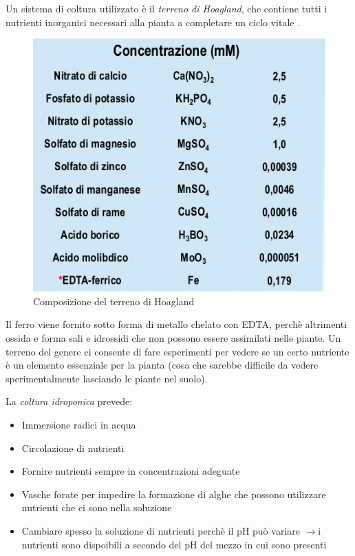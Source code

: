 \documentclass[a4paper,12pt]{book}
\newcommand{\lfreccia}{\ensuremath{\longrightarrow}}
\begin{document}
Un sistema di coltura utilizzato è il \emph{terreno di Hoagland}, che contiene tutti i nutrienti inorganici necessari alla pianta a completare un ciclo vitale .
\begin{figure}[H]
\centering
\includegraphics[scale=0.4]{immagini/hoagland.jpg}
\caption{Composizione del terreno di Hoagland}
\end{figure}
 Il ferro viene fornito sotto forma di metallo chelato con EDTA, perchè altrimenti ossida e forma sali e idrossidi che non possono essere assimilati nelle piante.
Un terreno del genere ci consente di fare esperimenti per vedere se un certo nutriente è un elemento essenziale per la pianta (cosa che sarebbe difficile da vedere sperimentalmente lasciando le piante nel suolo).
 
La \emph{coltura idroponica} prevede:
\begin{itemize}
\item{Immersione radici in acqua}
\item{Circolazione di nutrienti}
\item{Fornire nutrienti sempre in concentrazioni adeguate}
\item{Vasche forate per impedire la formazione di alghe che possono utilizzare nutrienti che ci sono nella soluzione}
\item{Cambiare spesso la soluzione di nutrienti perchè il pH può variare \lfreccia i nutrienti sono dispoibili a secondo del pH del mezzo in cui sono presenti}
\end{itemize}
\end{document}
